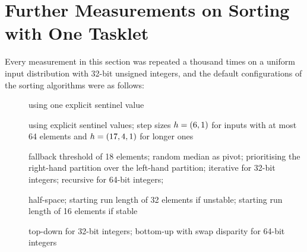 \chapter{Further Measurements on Sorting with One Tasklet}
\label{apx:tasklet}

Every measurement in this section was repeated a thousand times on a uniform input distribution with 32-bit unsigned integers, and the default configurations of the sorting algorithms were as follows:
\begin{description}
	\item[\IS{}]
	using one explicit sentinel value

	\item[\ShS{}]
	using explicit sentinel values;
	step sizes \(h = (6, 1)\) for inputs with at most 64 elements and \(h = (17, 4, 1)\) for longer ones

	\item[\QS{}]
	fallback threshold of 18 elements;
	random median as pivot;
	prioritising the right-hand partition over the left-hand partition;
	iterative for 32-bit integers;
	recursive for 64-bit integers;

	\item[\MS{}]
	half-space;
	starting run length of 32 elements if unstable;
	starting run length of 16 elements if stable

	\item[\HS{}]
	top-down for 32-bit integers;
	bottom-up with swap disparity for 64-bit integers
\end{description}

\clearpage


\clearpage


\clearpage


\clearpage


\clearpage

